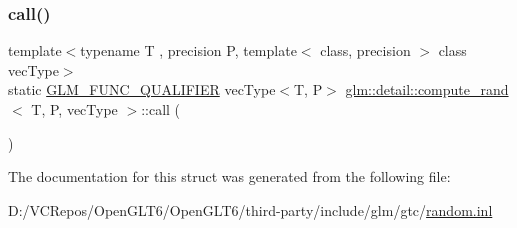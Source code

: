 \subsubsection{\texorpdfstring{call()}{call()}}
{\footnotesize\ttfamily template$<$typename T , precision P, template$<$ class, precision $>$ class vec\+Type$>$ \\
static \mbox{\hyperlink{setup_8hpp_a33fdea6f91c5f834105f7415e2a64407}{G\+L\+M\+\_\+\+F\+U\+N\+C\+\_\+\+Q\+U\+A\+L\+I\+F\+I\+ER}} vec\+Type$<$T, P$>$ \mbox{\hyperlink{structglm_1_1detail_1_1compute__rand}{glm\+::detail\+::compute\+\_\+rand}}$<$ T, P, vec\+Type $>$\+::call (\begin{DoxyParamCaption}{ }\end{DoxyParamCaption})\hspace{0.3cm}{\ttfamily [static]}}



The documentation for this struct was generated from the following file\+:\begin{DoxyCompactItemize}
\item 
D\+:/\+V\+C\+Repos/\+Open\+G\+L\+T6/\+Open\+G\+L\+T6/third-\/party/include/glm/gtc/\mbox{\hyperlink{random_8inl}{random.\+inl}}\end{DoxyCompactItemize}
